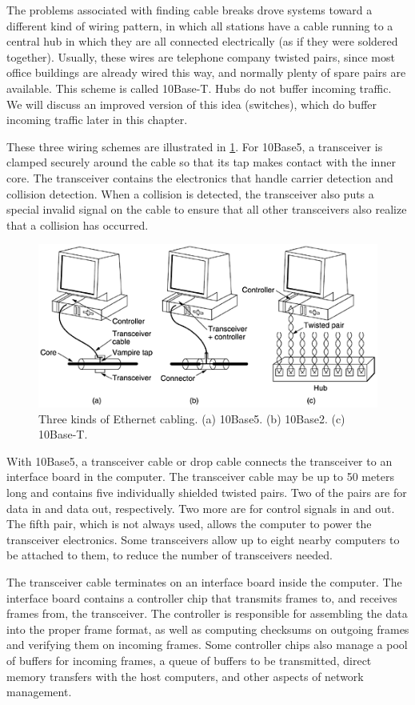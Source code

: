The problems associated with finding cable breaks drove systems toward a
different kind of wiring pattern, in which all stations have a cable
running to a central {hub} in which they are all connected electrically
(as if they were soldered together). Usually, these wires are telephone
company twisted pairs, since most office buildings are already wired
this way, and normally plenty of spare pairs are available. This scheme
is called {10Base-T}. Hubs do not buffer incoming traffic. We will
discuss an improved version of this idea (switches), which do buffer
incoming traffic later in this chapter.

These three wiring schemes are illustrated in \cref{fig:three-ethernet-cabling}.
For 10Base5, a {transceiver} is clamped securely around the cable
so that its tap makes contact with the inner core. The transceiver
contains the electronics that handle carrier detection and collision
detection. When a collision is detected, the transceiver also puts a
special invalid signal on the cable to ensure that all other
transceivers also realize that a collision has occurred.


\begin{figure}
   \centering
   \includegraphics[width=.7\textwidth]{images/04fig14.png}
   \caption{Three kinds of Ethernet cabling. (a) 10Base5. (b) 10Base2. (c) 10Base-T.}
   \label{fig:three-ethernet-cabling}
\end{figure}


With 10Base5, a {transceiver cable} or {drop cable} connects the
transceiver to an interface board in the computer. The transceiver cable
may be up to 50 meters long and contains five individually shielded
twisted pairs. Two of the pairs are for data in and data out,
respectively. Two more are for control signals in and out. The fifth
pair, which is not always used, allows the computer to power the
transceiver electronics. Some transceivers allow up to eight nearby
computers to be attached to them, to reduce the number of transceivers
needed.

The transceiver cable terminates on an interface board inside the
computer. The interface board contains a controller chip that transmits
frames to, and receives frames from, the transceiver. The controller is
responsible for assembling the data into the proper frame format, as
well as computing checksums on outgoing frames and verifying them on
incoming frames. Some controller chips also manage a pool of buffers for
incoming frames, a queue of buffers to be transmitted, direct memory
transfers with the host computers, and other aspects of network
management.

